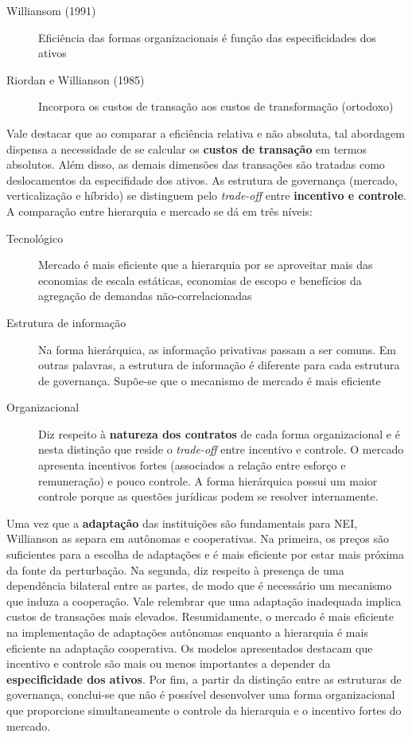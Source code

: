 \begin{description}
	\item[Williansom (1991)] Eficiência das formas organizacionais é função das especificidades dos ativos
	\item[Riordan e Willianson (1985)] Incorpora os custos de transação aos custos de transformação (ortodoxo)
\end{description}
Vale destacar que ao comparar a eficiência relativa e não absoluta, tal abordagem dispensa a necessidade de se calcular os \textbf{custos de transação} em termos absolutos. Além disso, as demais dimensões das transações são tratadas como deslocamentos da especifidade dos ativos. As estrutura de governança (mercado, verticalização e híbrido) se distinguem pelo \textit{trade-off} entre \textbf{incentivo e controle}. A comparação entre hierarquia e mercado se dá em três níveis:

\begin{description}
	\item[Tecnológico] Mercado é mais eficiente que a hierarquia por se aproveitar mais das economias de escala estáticas, economias de escopo e benefícios da agregação de demandas não-correlacionadas
	\item[Estrutura de informação] Na forma hierárquica, as informação privativas passam a ser comuns. Em outras palavras, a estrutura de informação é diferente para cada estrutura de governança. Supõe-se que o mecanismo de mercado é mais eficiente
	\item[Organizacional] Diz respeito à \textbf{natureza dos contratos} de cada forma organizacional e é nesta distinção que reside o \textit{trade-off} entre incentivo e controle. O mercado apresenta incentivos fortes (associados a relação entre esforço e remuneração) e pouco controle. A forma hierárquica possui um maior controle porque as questões jurídicas podem se resolver internamente.
\end{description}

Uma vez que a \textbf{adaptação} das instituições são fundamentais para NEI, Willianson as separa em autônomas e cooperativas. Na primeira, os preços são suficientes para a escolha de adaptações e é mais eficiente por estar mais próxima da fonte da perturbação. Na segunda, diz respeito à presença de uma dependência bilateral entre as partes, de modo que é necessário um mecanismo que induza a cooperação. Vale relembrar que uma adaptação inadequada implica custos de transações mais elevados. Resumidamente, o mercado é mais eficiente na implementação de adaptações autônomas enquanto a hierarquia é mais eficiente na adaptação cooperativa.
Os modelos apresentados destacam que incentivo e controle são mais ou menos importantes a depender da \textbf{especificidade dos ativos}.
Por fim, a partir da distinção entre as estruturas de governança, conclui-se que não é possível desenvolver uma forma organizacional que proporcione simultaneamente o controle da hierarquia e o incentivo fortes do mercado.

